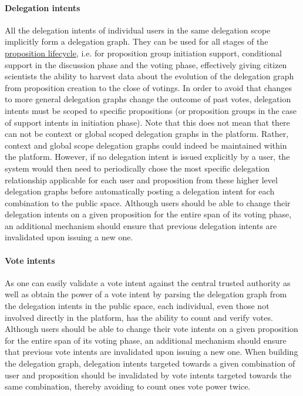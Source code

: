 \paragraph{Delegation intents}
All the delegation intents of individual users in the same delegation scope implicitly form a delegation graph.
They can be used for all stages of the \hyperref[sec:Model_Propositions]{proposition lifecycle}, i.e. for proposition group initiation support, conditional support in the discussion phase and the voting phase, effectively giving citizen scientists the ability to harvest data about the evolution of the delegation graph from proposition creation to the close of votings.
In order to avoid that changes to more general delegation graphs change the outcome of past votes, delegation intents must be scoped to specific propositions (or proposition groups in the case of support intents in initiation phase).
Note that this does not mean that there can not be context or global scoped delegation graphs in the platform.
Rather, context and global scope delegation graphs could indeed be maintained within the platform.
However, if no delegation intent is issued explicitly by a user, the system would then need to periodically chose the most specific delegation relationship applicable for each user and proposition from these higher level delegation graphs before automatically posting a delegation intent for each combination to the public space.
Although users should be able to change their delegation intents on a given proposition for the entire span of its voting phase, an additional mechanism should ensure that previous delegation intents are invalidated upon issuing a new one.

\paragraph{Vote intents}
As one can easily validate a vote intent against the central trusted authority as well as obtain the power of a vote intent by parsing the delegation graph from the delegation intents in the public space, each individual, even those not involved directly in the platform, has the ability to count and verify votes.
Although users should be able to change their vote intents on a given proposition for the entire span of its voting phase, an additional mechanism should ensure that previous vote intents are invalidated upon issuing a new one.
When building the delegation graph, delegation intents targeted towards a given combination of user and proposition should be invalidated by vote intents targeted towards the same combination, thereby avoiding to count ones vote power twice.

